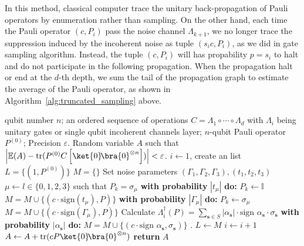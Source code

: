 \documentclass[aps,%
twocolumn,%
floatfix,%
pra,%
amsfonts,%
longbibliography,%
groupedaddress,%
superscriptaddress]{revtex4-2}%
\newcommand{\1}{\mathbbm{1}}
\begin{document}
In this method, classical computer trace the unitary back-propagation of Pauli operators by enumeration rather than sampling. On the other hand, each time the Pauli operator $(c,P_i)$ pass the noise channel $\Lambda_{k+1}$, we no longer trace the suppression induced by the incoherent noise as tuple $(s_i c,P_i)$, as we did in gate sampling algorithm. Instead, the tuple $(c,P_i)$ will has propability  $p =s_i$ to halt and do not participate in the following propagation. When the propagation halt or end at the $d$-th depth, we sum the tail of the propagation graph to estimate the average of the Pauli operator, as shown in Algorithm~\ref{alg:truncated_sampling} above. 


    \begin{algorithm}[htbp!]
\caption{Truncated Sampling algorithm}
\label{alg:truncated_sampling}
\begin{algorithmic}[1]
\Require qubit number $n$; an ordered sequence of operations $C = \Lambda_1 \circ \cdots \circ \Lambda_{d}$ with $\Lambda_i$ being unitary gates or single qubit incoherent channels layer; $n$-qubit Pauli operator $P^{(0)}$; Precision $\varepsilon$.
\Ensure  Random variable $A$ such that $\left|\mathbb{E}(A) - \text{tr}( P^{(0)} C\left[\ket{0}\!\bra{0}^{\otimes n}\right] )\right| < \varepsilon$.
\State $i \gets 1$, create an list $L=\{(1,P^{(0)})\}$  
\State $M=\{\}$  
    \State Set noise parameters $(\Gamma_1,\Gamma_2,\Gamma_3), (t_1,t_2,t_3)$
            \State  $\mu \gets l \in \{0,1,2,3\}$ such that $P_k = \sigma_\mu$
                \State \textbf{with probability} $|t_\mu|$ \textbf{do:}
            \State \quad $P_k \gets \mathbb{I} $ 
             \State \quad $M = M \cup \{( c \cdot  \text{sign}(t_\mu) ,P)\}$
                \State \textbf{with probability} $|\Gamma_\mu|$ \textbf{do:}
            \State \quad $P_k \gets  \sigma_\mu$ 
                \State \quad $M = M \cup \{(c \cdot \text{sign}(\Gamma_\mu),P)\}$
        \State Calculate $\Lambda_i^\dagger(P) = \sum_{\mathbf{s} \in S } |\alpha_{\mathbf{s}}|\cdot\text{sign~} \alpha_{\mathbf{s}}\cdot  \sigma_{\mathbf{s}}$
        \State \textbf{with probability} $|\alpha_{\mathbf{s}}|$ \textbf{do:}
        \State \quad $M = M \cup \{( c \cdot \text{sign~}\alpha_{\mathbf{s}} ,  \sigma_{\mathbf{s}})\}$ . 
        \EndFor
    \EndIf
    \EndFor
    \State $L \gets M$
    \State $i \gets i + 1$
\EndWhile
{}
    \State $A \gets A+\text{tr}(cP \ket{0}\!\bra{0}^{\otimes n})$
\EndFor
\State \textbf{return} $A$
\end{algorithmic}
\end{algorithm}
\end{document}
